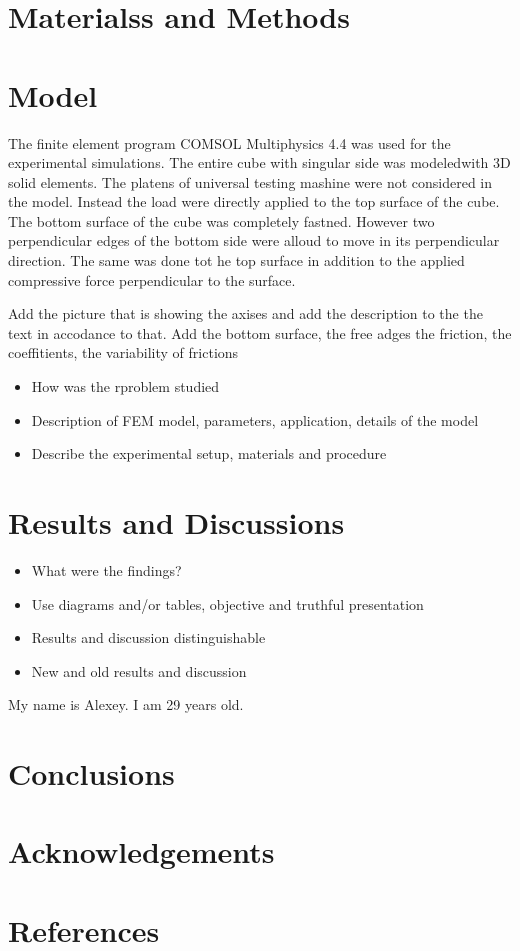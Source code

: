 \documentclass[review]{elsarticle}
\begin{document}
\section{Materialss and Methods}
\section{Model}

The finite element program COMSOL Multiphysics 4.4 \cite{Comsol} was used for
the experimental simulations.
The entire cube with singular side was modeledwith 3D solid elements.
The platens of universal testing mashine were not considered in the model.
Instead the load were directly applied to the top surface of the cube. The
bottom surface of the cube was completely {\color{red}fastned}. However two
perpendicular edges of the bottom side were alloud to move in its perpendicular
direction. The same was done tot he top surface in addition to the applied
compressive force perpendicular to the surface.

{\color {red}Add the picture that is showing the axises and add the
description to the the text in accodance to that. Add the bottom surface, the
free adges the friction, the coeffitients, the variability of frictions}
\begin{itemize}
\color{red}

\item How was the rproblem studied 
\item Description of FEM model, parameters, application, details of the model
\item Describe the experimental setup, materials and procedure
\end{itemize}


\section{Results and Discussions}
\begin{itemize}
\color{red}
\item What were the findings?
\item Use diagrams and/or tables, objective and truthful presentation
\item Results and discussion distinguishable
\item New and old results and discussion
\end{itemize}

My name \cite{Dirac1953888} is Alexey. I am 29 \cite{Feynman1963118,
Dirac1953888} years old.

\section{Conclusions}

\section*{Acknowledgements}

\section*{References}


\end{document}
